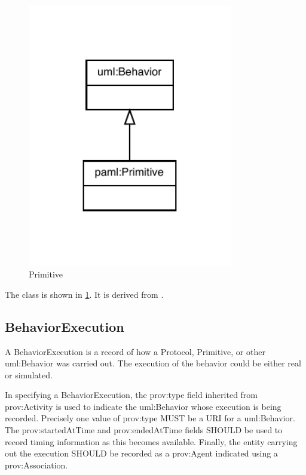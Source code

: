 \begin{figure}[h!]%
\centering%
\includegraphics[width=0.8\textwidth]{paml_classes/Primitive_abstraction_hierarchy.pdf}%
\caption{Primitive}%
\label{fig:Primitive}%
\end{figure}

%
The  class is shown in \ref{fig:Primitive}. It is derived from .%
%
\subsection{BehaviorExecution}%
\label{sec:paml:BehaviorExecution}%
A BehaviorExecution is a record of how a Protocol, Primitive, or other uml:Behavior was carried out.
        The execution of the behavior could be either real or simulated.

        In specifying a BehaviorExecution, the prov:type field inherited from prov:Activity is used to indicate the
        uml:Behavior whose execution is being recorded. Precisely one value of prov:type MUST be a URI for a uml:Behavior.
        The prov:startedAtTime and prov:endedAtTime fields SHOULD be used to record timing information as this becomes
        available.
        Finally, the entity carrying out the execution SHOULD be recorded as a prov:Agent indicated using a
        prov:Association.

